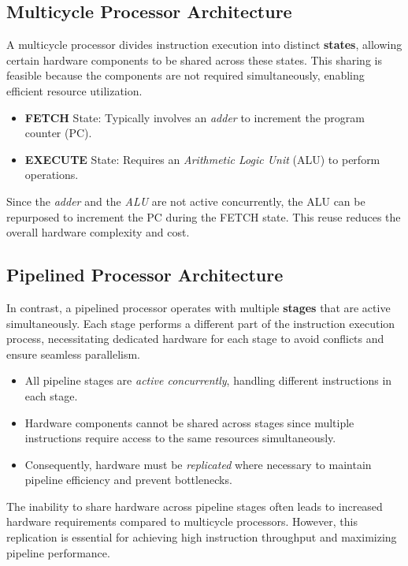 \subsection{Multicycle Processor Architecture}

A multicycle processor divides instruction execution into distinct \textbf{states}, allowing certain hardware components to be shared across these states. This sharing is feasible because the components are not required simultaneously, enabling efficient resource utilization.

\begin{itemize}
    \item \textbf{FETCH} State: Typically involves an \textit{adder} to increment the program counter (PC).
    \item \textbf{EXECUTE} State: Requires an \textit{Arithmetic Logic Unit} (ALU) to perform operations.
\end{itemize}

Since the \textit{adder} and the \textit{ALU} are not active concurrently, the ALU can be repurposed to increment the PC during the FETCH state. This reuse reduces the overall hardware complexity and cost.

\subsection{Pipelined Processor Architecture}

In contrast, a pipelined processor operates with multiple \textbf{stages} that are active simultaneously. Each stage performs a different part of the instruction execution process, necessitating dedicated hardware for each stage to avoid conflicts and ensure seamless parallelism.

\begin{itemize}
    \item All pipeline stages are \textit{active concurrently}, handling different instructions in each stage.
    \item Hardware components cannot be shared across stages since multiple instructions require access to the same resources simultaneously.
    \item Consequently, hardware must be \textit{replicated} where necessary to maintain pipeline efficiency and prevent bottlenecks.
\end{itemize}

The inability to share hardware across pipeline stages often leads to increased hardware requirements compared to multicycle processors. However, this replication is essential for achieving high instruction throughput and maximizing pipeline performance.
\newpage
